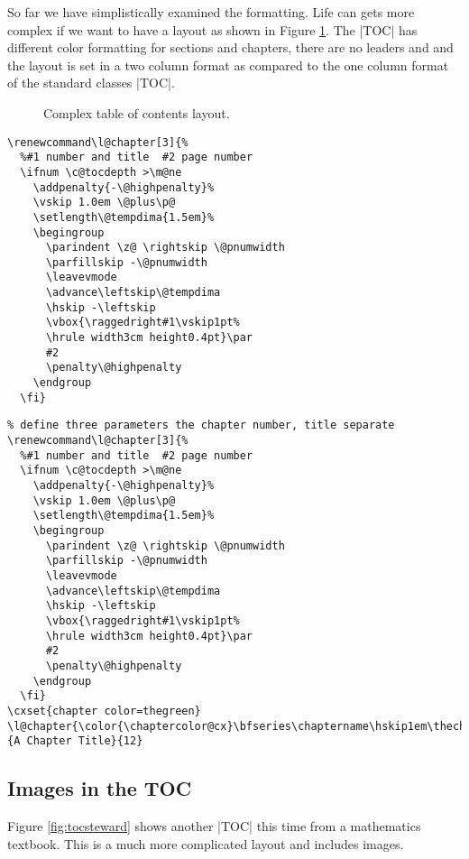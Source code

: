 So far we have simplistically examined the formatting. Life can gets more complex if we want to have a layout as shown in Figure \ref{fig:toc}. The |TOC| has different color formatting for sections and chapters, there are no leaders and and the layout is set in a two column format as compared to the one column format of the standard classes |TOC|.

\begin{figure}[tp]
\centering
{}
\caption{Complex table of contents layout.}
\label{fig:toc}
\end{figure}


\begin{lstlisting}
\renewcommand\l@chapter[3]{%
  %#1 number and title  #2 page number
  \ifnum \c@tocdepth >\m@ne
    \addpenalty{-\@highpenalty}%
    \vskip 1.0em \@plus\p@
    \setlength\@tempdima{1.5em}%
    \begingroup
      \parindent \z@ \rightskip \@pnumwidth
      \parfillskip -\@pnumwidth
      \leavevmode
      \advance\leftskip\@tempdima
      \hskip -\leftskip
      \vbox{\raggedright#1\vskip1pt%
      \hrule width3cm height0.4pt}\par
      #2
      \penalty\@highpenalty
    \endgroup
  \fi}
\end{lstlisting}

\begin{lstlisting}
% define three parameters the chapter number, title separate
\renewcommand\l@chapter[3]{%
  %#1 number and title  #2 page number
  \ifnum \c@tocdepth >\m@ne
    \addpenalty{-\@highpenalty}%
    \vskip 1.0em \@plus\p@
    \setlength\@tempdima{1.5em}%
    \begingroup
      \parindent \z@ \rightskip \@pnumwidth
      \parfillskip -\@pnumwidth
      \leavevmode
      \advance\leftskip\@tempdima
      \hskip -\leftskip
      \vbox{\raggedright#1\vskip1pt%
      \hrule width3cm height0.4pt}\par
      #2
      \penalty\@highpenalty
    \endgroup
  \fi}
\cxset{chapter color=thegreen}
\l@chapter{\color{\chaptercolor@cx}\bfseries\chaptername\hskip1em\thechapter}{A Chapter Title}{12}
\end{lstlisting}


\subsection{Images in the TOC}
Figure \ref{fig:tocsteward} shows another |TOC| this time from a mathematics textbook. This is a much more complicated layout and includes images.

